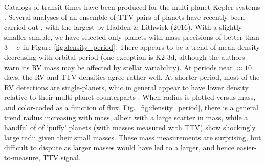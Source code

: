 \documentclass[graybox,natbib,nosecnum]{svmult}
\begin{document}
Catalogs of transit times have been produced for the multi-planet Kepler systems \citep{2013ApJS..208...16M,2016ApJS..225....9H}. Several analyses of an ensemble of TTV pairs of planets have recently been carried out \citep{2014ApJ...787...80H,2013ApJS..208...22X,2014ApJS..210...25X,2016ApJ...820...39J}, with the largest by Hadden \& Lithwick (2016).  With a slightly smaller sample, we have selected only planets with mass precisions of better than $3-\sigma$ in Figure \ref{fig:density_period}.  There appears to be a trend of mean density decreasing with orbital period (one exception is K2-3d, although the authors warn its RV mass may be affected by stellar variability).  At periods near $\approx 10$ days, the RV and TTV densities agree rather well.  At shorter period, most of the RV detections are single-planets, whic in general appear to have lower density relative to their multi-planet counterparts \citep{Steffen2016}.  When radius is plotted versus mass, and color-coded as a function of flux, Fig.\ \ref{fig:density_period}, there is a general trend radius increasing with mass, albeit with a large scatter in mass, while a handful of of `puffy' planets (with masses measured with TTV) show shockingly large radii given their small masses.  These mass measurements are surprising, but difficult to dispute as larger masses would have led to a larger, and hence easier-to-measure, TTV signal.
\end{document}

